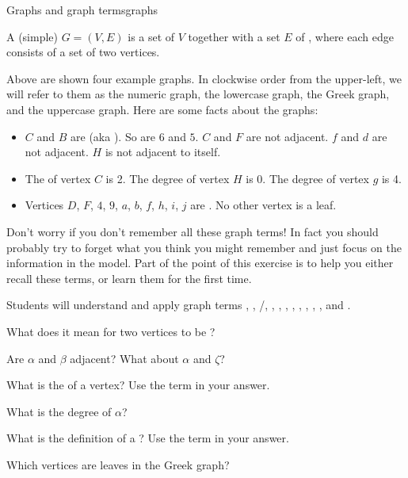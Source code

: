 \documentclass{tufte-handout}
\begin{document}
\begin{model}{Graphs and graph terms}{graphs}
  \vspace{1em}
  \begin{defn}
    A (simple)  $G = (V,E)$ is a set of  $V$
    together with a set $E$ of , where each edge consists
    of a set of two vertices.
  \end{defn}

  Above are shown four example graphs.  In clockwise order from the
  upper-left, we will refer to them as the numeric graph, the
  lowercase graph, the Greek graph, and the uppercase graph.  Here are
  some facts about the graphs:

  \begin{itemize}
  \item $C$ and $B$ are  (aka ).  So
    are $6$ and $5$.  $C$ and $F$ are not adjacent.  $f$ and $d$ are
    not adjacent.  $H$ is not adjacent to itself.
  \item The  of vertex $C$ is 2.  The degree of vertex $H$ is
    0.  The degree of vertex $g$ is 4.
  \item Vertices $D$, $F$, $4$, $9$, $a$, $b$, $f$, $h$, $i$, $j$ are
    .  No other vertex is a leaf.
  \end{itemize}
\end{model}

Don't worry if you don't remember all these graph terms!  In fact you
should probably try to forget what you think you might remember and
just focus on the information in the model. Part of the point of this
exercise is to help you either recall these terms, or learn them for
the first time.

\begin{objective}
  Students will understand and apply graph terms ,
  , /, , ,
  , , ,
  , , , and .
\end{objective}

\begin{questions}
\item What does it mean for two vertices to be ?
\item Are $\alpha$ and $\beta$ adjacent?   What about $\alpha$ and $\zeta$?
\item What is the  of a vertex?  Use the term
   in your answer.
\item What is the degree of $\alpha$?
\item What is the definition of a ?  Use the term
   in your answer.
\item Which vertices are leaves in the Greek graph?
\end{questions}
\end{document}

